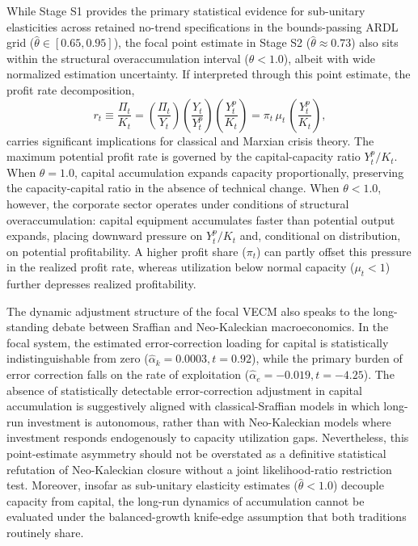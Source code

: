 While Stage S1 provides the primary statistical evidence for sub-unitary elasticities across retained no-trend specifications in the bounds-passing ARDL grid ($\hat{\theta} \in [0.65, 0.95]$), the focal point estimate in Stage S2 ($\hat{\theta} \approx 0.73$) also sits within the structural overaccumulation interval ($\theta < 1.0$), albeit with wide normalized estimation uncertainty. If interpreted through this point estimate, the profit rate decomposition,
\begin{equation}
r_t \equiv \frac{\Pi_t}{K_t} = \left(\frac{\Pi_t}{Y_t}\right) \left(\frac{Y_t}{Y^p_t}\right) \left(\frac{Y^p_t}{K_t}\right) = \pi_t \, \mu_t \, \left(\frac{Y^p_t}{K_t}\right),
\end{equation}
carries significant implications for classical and Marxian crisis theory. The maximum potential profit rate is governed by the capital-capacity ratio $Y^p_t / K_t$. When $\theta = 1.0$, capital accumulation expands capacity proportionally, preserving the capacity-capital ratio in the absence of technical change. When $\theta < 1.0$, however, the corporate sector operates under conditions of structural overaccumulation: capital equipment accumulates faster than potential output expands, placing downward pressure on $Y^p_t / K_t$ and, conditional on distribution, on potential profitability. A higher profit share ($\pi_t$) can partly offset this pressure in the realized profit rate, whereas utilization below normal capacity ($\mu_t < 1$) further depresses realized profitability.

The dynamic adjustment structure of the focal VECM also speaks to the long-standing debate between Sraffian and Neo-Kaleckian macroeconomics. In the focal system, the estimated error-correction loading for capital is statistically indistinguishable from zero ($\hat{\alpha}_k = 0.0003, t=0.92$), while the primary burden of error correction falls on the rate of exploitation ($\hat{\alpha}_e = -0.019, t=-4.25$). The absence of statistically detectable error-correction adjustment in capital accumulation is suggestively aligned with classical-Sraffian models in which long-run investment is autonomous, rather than with Neo-Kaleckian models where investment responds endogenously to capacity utilization gaps. Nevertheless, this point-estimate asymmetry should not be overstated as a definitive statistical refutation of Neo-Kaleckian closure without a joint likelihood-ratio restriction test. Moreover, insofar as sub-unitary elasticity estimates ($\hat{\theta} < 1.0$) decouple capacity from capital, the long-run dynamics of accumulation cannot be evaluated under the balanced-growth knife-edge assumption that both traditions routinely share.

